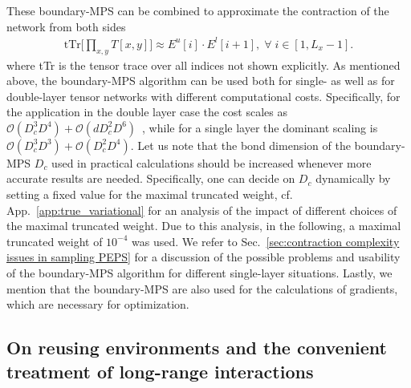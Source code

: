 \documentclass[aps,notitlepage,twocolumn,nofootinbib,superscriptaddress,pra,10pt]{revtex4-2}
\begin{document}
These boundary-MPS can be combined to approximate the contraction of the network from both sides
\begin{equation}
\begin{split}
 \text{tTr}\biggl[\prod_{x,y} T[x,y]  \biggr] \approx 
 E^u[i] \cdot E^l[i+1], \; \forall \; i \in [1,L_x-1].
\end{split}
\label{eq:boundary_MPS_approx}
\end{equation}
where tTr is the tensor trace over all indices not shown explicitly.
As mentioned above, the boundary-MPS algorithm can be used both for single- as well as for double-layer tensor networks with different computational costs.
Specifically, for the application in the double layer case the cost scales as $\mathcal{O}(D_c^3 D^4) + \mathcal{O}(dD_c^2 D^6)$~\cite{Lubasch_2014fPEPS}, while for a single layer the dominant scaling is $\mathcal{O}(D_c^3 D^3) + \mathcal{O}(D_c^2 D^4)$. 
Let us note that the bond dimension of the boundary-MPS $D_c$ used in practical calculations should be increased whenever more accurate results are needed. Specifically, one can decide on $D_c$ dynamically by setting a fixed value for the maximal truncated weight, cf. App.~\ref{app:true_variational} for an analysis of the impact of different choices of the maximal truncated weight. Due to this analysis, in the following, a maximal truncated weight of $10^{-4}$ was used.
We refer to Sec.~\ref{sec:contraction complexity issues in sampling PEPS} for a discussion of the possible problems and usability of the boundary-MPS algorithm for different single-layer situations.
Lastly, we mention that the boundary-MPS are also used for the calculations of gradients, which are necessary for optimization. %



\subsection{On reusing environments and the convenient treatment of long-range interactions}
\label{sec:reusing_envs}
\end{document}
